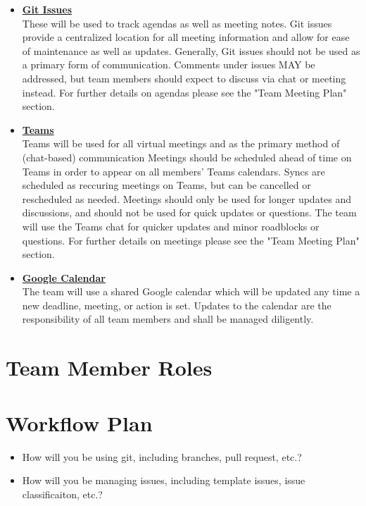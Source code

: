 \documentclass{article}
\begin{document}
\begin{itemize}
	\item \textbf{\underline{Git Issues}} \\
	These will be used to track agendas as well as meeting notes. 
	Git issues provide a centralized location for all meeting information and allow for ease of maintenance as well as updates. 
	Generally, Git issues should not be used as a primary form of communication.
	 Comments under issues MAY be addressed, but team members should expect to discuss via chat or meeting instead.
	For further details on agendas please see the "Team Meeting Plan" section.\\
	\item \textbf{\underline{Teams}} \\
	Teams will be used for all virtual meetings and as the primary method of (chat-based) communication 
	Meetings should be scheduled ahead of time on Teams in order to appear on all members' Teams calendars.
	Syncs are scheduled as reccuring meetings on Teams, but can be cancelled or rescheduled as needed.
	Meetings should only be used for longer updates and discussions, and should not be used for quick updates or questions.
	The team will use the Teams chat for quicker updates and minor roadblocks or questions.
	For further details on meetings please see the "Team Meeting Plan" section. \\
	\item \textbf{\underline{Google Calendar}} \\
	The team will use a shared Google calendar which will be updated any time a new deadline, meeting, or action is set. 
	Updates to the calendar are the responsibility of all team members and shall be managed diligently. \\
\end{itemize}



\section{Team Member Roles}

\section{Workflow Plan}

\begin{itemize}
	\item How will you be using git, including branches, pull request, etc.?
	\item How will you be managing issues, including template issues, issue
	classificaiton, etc.?
\end{itemize}
\end{document}
